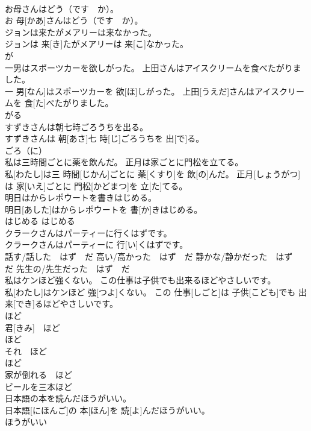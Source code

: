 \documentclass[8pt]{extreport}
\begin{document}
\begin{CJK}{UTF8}{min}
\\	お母さんはどう（です　か）。	
\\	お 母[かあ]さんはどう（です　か）。	
\\	ジョンは来たがメアリーは来なかった。	
\\	ジョンは 来[き]たがメアリーは 来[こ]なかった。	
\\	が　
\\	一男はスポーツカーを欲しがった。 上田さんはアイスクリームを食べたがりました。	
\\	一 男[なん]はスポーツカーを 欲[ほ]しがった。 上田[うえだ]さんはアイスクリームを 食[た]べたがりました。	
\\	がる	
\\	すずきさんは朝七時ごろうちを出る。	
\\	すずきさんは 朝[あさ]七 時[じ]ごろうちを 出[で]る。	
\\	ごろ（に）	
\\	私は三時間ごとに薬を飲んだ。 正月は家ごとに門松を立てる。	
\\	私[わたし]は三 時間[じかん]ごとに 薬[くすり]を 飲[の]んだ。 正月[しょうがつ]は 家[いえ]ごとに 門松[かどまつ]を 立[た]てる。	
\\	明日はからレポウートを書きはじめる。	
\\	明日[あした]はからレポウートを 書[か]きはじめる。	
\\	はじめる	はじめる　
\\	クラークさんはパーティーに行くはずです。	
\\	クラークさんはパーティーに 行[い]くはずです。	
\\	話す/話した　はず　だ 高い/高かった　はず　だ 静かな/静かだった　はず　だ 先生の/先生だった　はず　だ	
\\	私はケンほど強くない。 この仕事は子供でも出来るほどやさしいです。	
\\	私[わたし]はケンほど 強[つよ]くない。 この 仕事[しごと]は 子供[こども]でも 出来[でき]るほどやさしいです。	
\\	ほど　
\\	君[きみ]　ほど　
\\	ほど　
\\	それ　ほど　
\\	ほど　
\\	家が倒れる　ほど　
\\	ビールを三本ほど　
\\	日本語の本を読んだほうがいい。	
\\	日本語[にほんご]の 本[ほん]を 読[よ]んだほうがいい。	
\\	ほうがいい	

\end{CJK}
\end{document}

